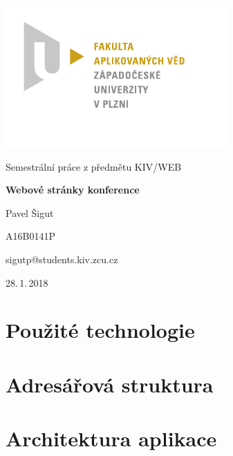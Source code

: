 \documentclass[
12pt,
a4paper,
pdftex,
czech,
titlepage, 
]{report}
\begin{document}
\begin{titlepage}
	\vspace*{-2cm}
	{\centering\includegraphics[scale=1.0]{img/logo_fav.pdf}\par}
	\centering
	\vspace*{2cm}
	{\Large Semestrální práce z předmětu KIV/WEB\par}
	\vspace{1.5cm}
	{\Huge\bfseries Webové stránky konference\par}		
	\vspace{2cm}

	{\Large Pavel Šigut\par}
	{\Large A16B0141P\par}
	{\Large sigutp@students.kiv.zcu.cz\par}	
	\vfill

	{\Large 28.\,1.\,2018}
\end{titlepage}

\tableofcontents
\thispagestyle{empty}
\clearpage

\chapter{Použité technologie}
\setcounter{page}{1}


\chapter{Adresářová struktura}


\chapter{Architektura aplikace}

\end{document}
